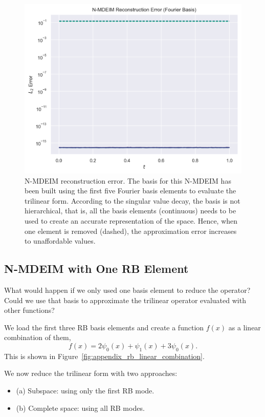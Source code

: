 \documentclass[../../thesis.tex]{subfiles}
\begin{document}
\begin{figure}[h]
    \includegraphics[width=\columnwidth]{research_project/piston/figures/svd_fourier/fourier_basis_mdeim_truncation_errors_comparison.png}
    \caption{N-MDEIM reconstruction error.
    The basis for this N-MDEIM has been built using 
    the first five Fourier basis elements to evaluate the trilinear form.
    According to the singular value decay, the basis is not hierarchical, 
    that is, all the basis elements (continuous) needs to be used to 
    create an accurate representation of the space.
    Hence, when one element is removed (dashed), 
    the approximation error increases to unaffordable values.}
    \label{fig:appendix_fourier_nmdeim_reconstruction_error}
\end{figure}

\subsection{N-MDEIM with One RB Element}
What would happen if we only used one basis element to reduce the operator?
Could we use that basis to approximate the trilinear operator evaluated with other functions?

We load the first three RB basis elements and create a function $f(x)$ as a linear combination of them,
\begin{equation}
    f(x) = 2 \psi_0(x) + \psi_1(x) + 3 \psi_0(x).
\end{equation} 
This is shown in Figure~\ref{fig:appendix_rb_linear_combination}.

We now reduce the trilinear form with two approaches:
\begin{itemize}
    \item (a) Subspace: using only the first RB mode.
    \item (b) Complete space: using all RB modes.
\end{itemize}
\end{document}
